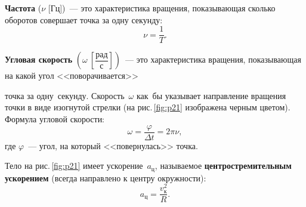 \documentclass[main.tex]{subfiles}
\begin{document}
\textbf{Частота} ($\nu$ [Гц])~--- это характеристика вращения, показывающая сколько оборотов совершает точка за одну секунду:
\begin{equation}
    \nu=\dfrac{1}{T}.
\end{equation}

\textbf{Угловая скорость} $\left(\omega\ \left[\dfrac{\text{рад}}{\text{с}}\right]\right)$~--- это характеристика вращения, показывающая на какой угол <<поворачивается>> \strut точка за одну~секунду. 
Скорость~$\omega$ как~бы указывает направление вращения точки в виде изогнутой стрелки (на рис.\,\ref{fig:p21} изображена черным цветом). Формула угловой скорости:
\begin{equation}
    \omega=\dfrac{\varphi}{\Delta t}=2\pi\nu,
\end{equation}
где $\varphi$~--- угол, на который <<повернулась>> точка.

Тело на рис.\,\ref{fig:p21} имеет ускорение~$a_\text{ц}$, называемое \textbf{центростремительным ускорением} (всегда направлено к центру окружности): 
\begin{equation}
    a_\text{ц}=\dfrac{v_\text{к}^2}{R}.
\end{equation}









 
\end{document}
